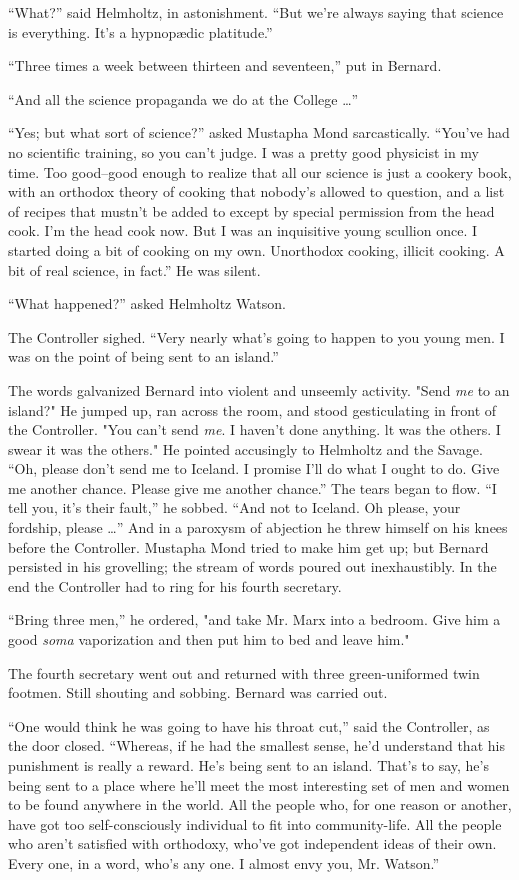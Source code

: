 \documentclass[12pt]{report}
\begin{document}
``What?'' said Helmholtz, in astonishment. ``But we're always saying
that science is everything. It's a hypnopædic platitude.''

``Three times a week between thirteen and seventeen,'' put in Bernard.

``And all the science propaganda we do at the College \ldots{}''

``Yes; but what sort of science?'' asked Mustapha Mond sarcastically.
``You've had no scientific training, so you can't judge. I was a pretty
good physicist in my time. Too good--good enough to realize that all our
science is just a cookery book, with an orthodox theory of cooking that
nobody's allowed to question, and a list of recipes that mustn't be
added to except by special permission from the head cook. I'm the head
cook now. But I was an inquisitive young scullion once. I started doing
a bit of cooking on my own. Unorthodox cooking, illicit cooking. A bit
of real science, in fact.'' He was silent.

``What happened?'' asked Helmholtz Watson.

The Controller sighed. ``Very nearly what's going to happen to you young
men. I was on the point of being sent to an island.''

The words galvanized Bernard into violent and unseemly activity. "Send
\emph{me} to an island?" He jumped up, ran across the room, and stood
gesticulating in front of the Controller. "You can't send \emph{me}. I
haven't done anything. lt was the others. I swear it was the others." He
pointed accusingly to Helmholtz and the Savage. ``Oh, please don't send
me to Iceland. I promise I'll do what I ought to do. Give me another
chance. Please give me another chance.'' The tears began to flow. ``I
tell you, it's their fault,'' he sobbed. ``And not to Iceland. Oh
please, your fordship, please \ldots{}'' And in a paroxysm of abjection
he threw himself on his knees before the Controller. Mustapha Mond tried
to make him get up; but Bernard persisted in his grovelling; the stream
of words poured out inexhaustibly. In the end the Controller had to ring
for his fourth secretary.

``Bring three men,'' he ordered, "and take Mr. Marx into a bedroom. Give
him a good \emph{soma} vaporization and then put him to bed and leave
him."

The fourth secretary went out and returned with three green-uniformed
twin footmen. Still shouting and sobbing. Bernard was carried out.

``One would think he was going to have his throat cut,'' said the
Controller, as the door closed. ``Whereas, if he had the smallest sense,
he'd understand that his punishment is really a reward. He's being sent
to an island. That's to say, he's being sent to a place where he'll meet
the most interesting set of men and women to be found anywhere in the
world. All the people who, for one reason or another, have got too
self-consciously individual to fit into community-life. All the people
who aren't satisfied with orthodoxy, who've got independent ideas of
their own. Every one, in a word, who's any one. I almost envy you, Mr.
Watson.''
\end{document}
